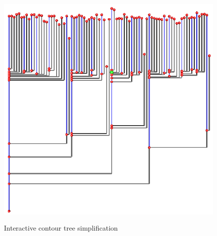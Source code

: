 \documentclass[11pt, b5paper]{report}
\begin{document}
\begin{figure}[h!]
{    \includegraphics[width=(\textwidth)/3]{images/contree-simp-02.png}}
  \caption{Interactive contour tree simplification}
  \label{fig:contree-simp}
\end{figure}
\end{document}
